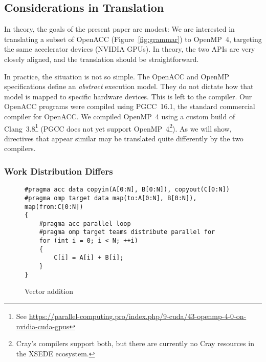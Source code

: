 \documentclass{sig-alternate-05-2015}
\begin{document}
\subsection{Considerations in Translation}
In theory, the goals of the present paper are modest: We are interested in
translating a subset of OpenACC (Figure~\ref{fig:grammar}) to OpenMP~4,
targeting the same accelerator devices (NVIDIA GPUs).  In theory, the two APIs
are very closely aligned, and the translation should be straightforward.

In practice, the situation is not so simple.  The OpenACC and OpenMP
specifications define an \emph{abstract} execution model.  They do not dictate
how that model is mapped to specific hardware devices.  This is left to the
compiler.  Our OpenACC programs were compiled using PGCC~16.1, the standard
commercial compiler for OpenACC\@.  We compiled OpenMP~4 using a custom build
of Clang~3.8\footnote{See \url{https://parallel-computing.pro/index.php/9-cuda/43-openmp-4-0-on-nvidia-cuda-gpus}} (PGCC does not yet support
OpenMP~4\footnote{Cray's compilers support both, but there are currently no
Cray resources in the XSEDE ecosystem.}).  As we will show, directives that
appear similar may be translated quite differently by the two compilers.

\subsubsection{Work Distribution Differs}

\begin{figure*}
\begin{center}
\begin{minipage}{4in}
{\footnotesize
\begin{verbatim}
#pragma acc data copyin(A[0:N], B[0:N]), copyout(C[0:N])
#pragma omp target data map(to:A[0:N], B[0:N]), map(from:C[0:N])
{
    #pragma acc parallel loop
    #pragma omp target teams distribute parallel for
    for (int i = 0; i < N; ++i)
    {
        C[i] = A[i] + B[i];
    }
}
\end{verbatim}
}
\end{minipage}
\end{center}
\caption{Vector addition}
\label{fig:vecadd}
\end{figure*}
\end{document}
